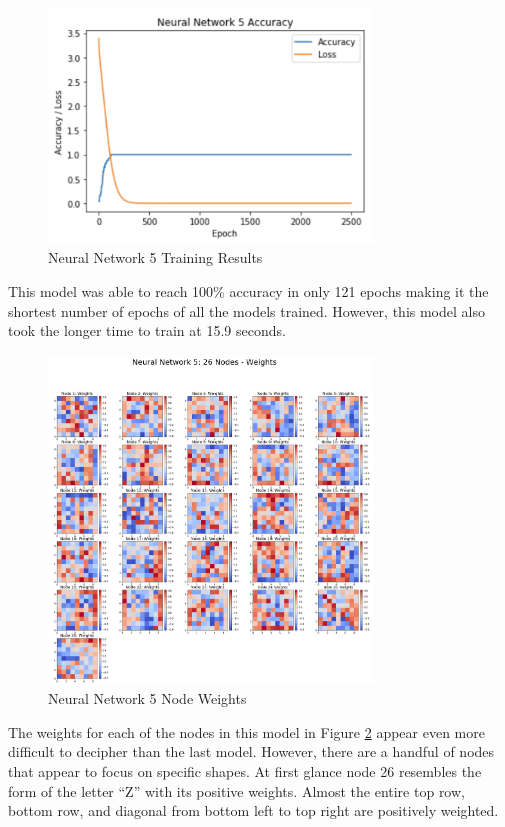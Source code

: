 \documentclass[5p,authoryear]{elsarticle}
\begin{document}
\begin{figure}[!htb] \centering
	\includegraphics[width=3.4in]{figures/nn5 plot.png}
	\caption[]{Neural Network 5 Training Results} 
	\label{test5c}
\end{figure}

This model was able to reach 100\% accuracy in only 121 epochs making it the shortest number of epochs of all the models trained. 
However, this model also took the longer time to train at 15.9 seconds.

\begin{figure}[!htb] \centering
	\includegraphics[width=3.4in]{figures/nn5_weights.png}
	\caption[]{Neural Network 5 Node Weights} 
	\label{test5d}
\end{figure}

The weights for each of the nodes in this model in Figure \ref{test5d} appear even more difficult to decipher than the last model. 
However, there are a handful of nodes that appear to focus on specific shapes. 
At first glance node 26 resembles the form of the letter “Z” with its positive weights. 
Almost the entire top row, bottom row, and diagonal from bottom left to top right are positively weighted. 
\end{document}
